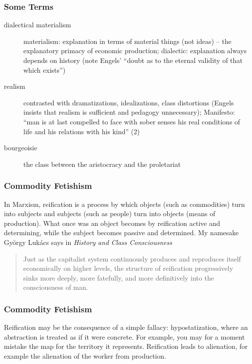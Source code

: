 \documentclass[xcolor=dvipsnames]{beamer}
\begin{document}
\begin{frame}
  \frametitle{Some Terms}
  \begin{description}
  \item[dialectical materialism] materialism: explanation in terms of
    material things (not ideas) -- the explanatory primacy of economic
    production; dialectic: explanation always depends on history (note
    Engels' ``doubt as to the eternal validity of that which exists'')
  \item[realism] contrasted with dramatizations, idealizations, class
    distortions (Engels insists that realism is sufficient and
    pedagogy unnecessary); Manifesto: ``man is at last compelled to
    face with sober senses his real conditions of life and his
    relations with his kind'' (2)
  \item[bourgeoisie] the class between the aristocracy and the
    proletariat
  \end{description}
\end{frame}

\begin{frame}
  \frametitle{Commodity Fetishism}
  In Marxism, \alert{reification} is a process by which objects (such
  as commodities) turn into subjects and subjects (such as people)
  turn into objects (means of production). What once was an object
  becomes by reification active and determining, while the subject
  becomes passive and determined. My namesake Gy{\"o}rgy Luk{\'a}cs
  says in \emph{History and Class Consciousness}
  \begin{quote}
    Just as the capitalist system continuously produces and reproduces
    itself economically on higher levels, the structure of reification
    progressively sinks more deeply, more fatefully, and more
    definitively into the consciousness of man.
  \end{quote}
\end{frame}

\begin{frame}
  \frametitle{Commodity Fetishism}
  Reification may be the consequence of a simple fallacy:
  \alert{hypostatization}, where an abstraction is treated as if it
  were concrete. For example, you may for a moment mistake the map for
  the territory it represents. Reification leads to
  \alert{alienation}, for example the alienation of the worker from
  production.
\end{frame}
\end{document}
